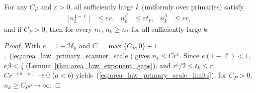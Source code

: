 \begin{lemma}
    \label{thm:area_law_primary_scale_limits}
    \leanok
    For any $C_P$ and $\varepsilon>0$, all sufficiently large $k$ (uniformly
    over primaries) satisfy
    \begin{align}
        \bigl\lfloor n_k^{1-\ell}\bigr\rfloor & \le\varepsilon r,   &
        n_k^\beta                             & \le\varepsilon t_k, &
        n_k^\beta                             & \le\varepsilon r,
        \label{eq:area_law_primary_scale_limits}
    \end{align}
    and if $C_P>0$, then for every $n_*$, $n_k\ge n_*$ for all sufficiently
    large $k$.
\end{lemma}
\begin{proof}\leanok
    With $e=1+2\delta_0$ and $C=\max\{C_P,0\}+1$,~(\ref{eq:area_law_primary_scanner_scale})
    gives $n_k\le Cr^e$. Since $e(1-\ell)<1$, $e\beta<\zeta$
    (Lemma~\ref{thm:area_law_exponent_gaps}), and $r^\zeta/2\le t_k\le r$,
    $Cr^{-(b-a)}\to0$ ($a<b$) yields~(\ref{eq:area_law_primary_scale_limits});
    for $C_P>0$, $n_k\ge C_P r\to\infty$.
\end{proof}
